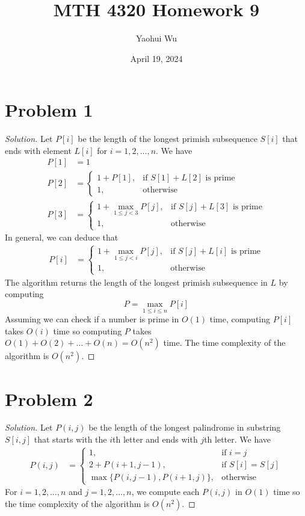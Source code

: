 \documentclass[12pt]{article}
\title{MTH 4320 Homework 9}
\author{Yaohui Wu}
\date{April 19, 2024}
\newenvironment*{solution}{\begin{proof}[Solution]}{\end{proof}}
\begin{document}
\maketitle
\section*{Problem 1}
\begin{solution}
    Let \(P[i]\) be the length of the longest primish subsequence \(S[i]\)
    that ends with element \(L[i]\) for \(i=1,2,\dots,n\). We have
    \begin{align*}
        P[1] &= 1 \\
        P[2] &= \begin{cases}
            1+P[1], &\text{if \(S[1]+L[2]\) is prime} \\
            1, &\text{otherwise}
        \end{cases} \\
        P[3] &= \begin{cases}
            1+\max_{1\leq j<3}P[j], &\text{if \(S[j]+L[3]\) is prime} \\
            1, &\text{otherwise}
        \end{cases}
    \end{align*}
    In general, we can deduce that
    \begin{align*}
        P[i] &= \begin{cases}
            1+\max_{1\leq j<i}P[j], &\text{if \(S[j]+L[i]\) is prime} \\
            1, &\text{otherwise}
        \end{cases}
    \end{align*}
    The algorithm returns the length of the longest primish subsequence in
    \(L\) by computing \[P=\max_{1\leq i\leq n}P[i]\] Assuming we can check if
    a number is prime in \(O(1)\) time, computing \(P[i]\) takes \(O(i)\) time
    so computing \(P\) takes \(O(1)+O(2)+\dots+O(n)=O(n^2)\) time. The time
    complexity of the algorithm is \(O(n^2)\).
\end{solution}
\section*{Problem 2}
\begin{solution}
    Let \(P(i,j)\) be the length of the longest palindrome in substring
    \(S[i,j]\) that starts with the \(i\)th letter and ends with \(j\)th
    letter. We have
    \begin{align*}
        P(i,j) &= \begin{cases}
            1, &\text{if \(i=j\)} \\
            2+P(i+1,j-1), &\text{if \(S[i]=S[j]\)} \\
            \max\{P(i,j-1),P(i+1,j)\}, &\text{otherwise}
        \end{cases}
    \end{align*}
    For \(i=1,2,\dots,n\) and \(j=1,2,\dots,n\), we compute each \(P(i,j)\) in
    \(O(1)\) time so the time complexity of the algorithm is \(O(n^2)\).
\end{solution}
\end{document}
